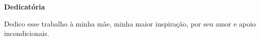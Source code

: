 \def\textoDedicatoria{
  Dedico esse trabalho à minha mãe, minha maior inspiração, por seu amor e apoio incondicionais.
}

\begin{dedicatoria}
  \textbf{Dedicatória}
  \vfill
  \hfill{}
  \parbox{6cm}{
    \begin{flushright}
      \textoDedicatoria\
    \end{flushright}
      }
\end{dedicatoria}